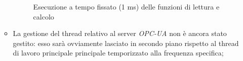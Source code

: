 \begin{itemize}
\begin{itemize}
\begin{figure}[H]
			\caption{Esecuzione a tempo fissato  (1 ms) delle funzioni di lettura e calcolo}
			\label{fig:xenomai_execution}
		\end{figure}
		\item La gestione del thread relativo al server \textit{OPC-UA} non è ancora stato gestito: esso sarà ovviamente lasciato in secondo piano rispetto al thread di lavoro principale principale temporizzato alla frequenza specifica;
	\end{itemize}
\end{itemize}